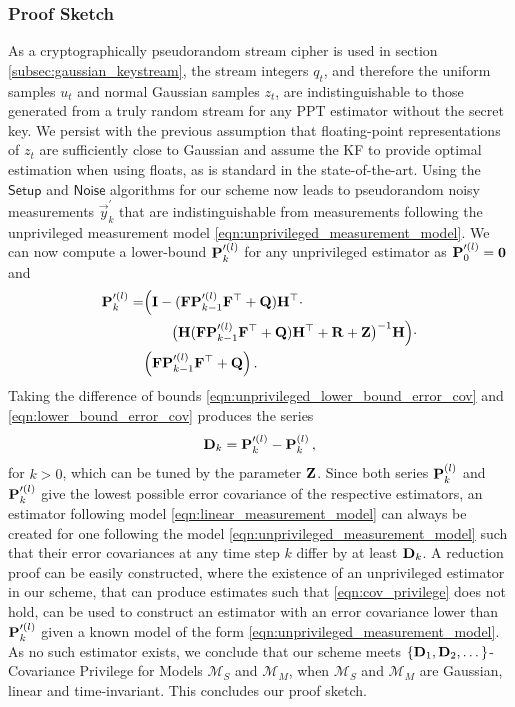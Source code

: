 \documentclass[letterpaper, 10 pt, conference]{ieeeconf}
\begin{document}
\subsubsection{Proof Sketch}
As a cryptographically pseudorandom stream cipher is used in section \ref{subsec:gaussian_keystream}, the stream integers $q_t$, and therefore the uniform samples $u_t$ and normal Gaussian samples $z_t$, are indistinguishable to those generated from a truly random stream for any PPT estimator without the secret key. We persist with the previous assumption that floating-point representations of $z_t$ are sufficiently close to Gaussian and assume the KF to provide optimal estimation when using floats, as is standard in the state-of-the-art. Using the $\mathsf{Setup}$ and $\mathsf{Noise}$ algorithms for our scheme now leads to pseudorandom noisy measurements $\vec{y}^\prime_k$ that are indistinguishable from measurements following the unprivileged measurement model \eqref{eqn:unprivileged_measurement_model}. We can now compute a lower-bound ${{\mathbf{P}}}_k^{\prime(l)}$ for any unprivileged estimator as ${{\mathbf{P}}}_0^{\prime(l)}={{\mathbf{0}}}$ and
\begin{equation}\label{eqn:unprivileged_lower_bound_error_cov}
   \begin{split}
      {\ensuremath{{\mathbf{P}}}}_k^{\prime(l)} =& \Bigl( {{\mathbf{I}}} - ({{\mathbf{F}}}{{\mathbf{P}}}_{k-1}^{\prime(l)}{{\mathbf{F}}}^\top + {{\mathbf{Q}}}){{\mathbf{H}}}^\top \cdot \\
      &\qquad\bigl({{\mathbf{H}}}({{\mathbf{F}}}{{\mathbf{P}}}_{k-1}^{\prime(l)}{{\mathbf{F}}}^\top + {{\mathbf{Q}}}){{\mathbf{H}}}^\top + {{\mathbf{R}}}+{{\mathbf{Z}}}\bigr)^{-1}{{\mathbf{H}}}\Bigr)\cdot\\
      &\Bigl({{\mathbf{F}}}{{\mathbf{P}}}_{k-1}^{\prime(l)}{{\mathbf{F}}}^\top + {{\mathbf{Q}}}\Bigr)\,.
   \end{split}
\end{equation}
Taking the difference of bounds \eqref{eqn:unprivileged_lower_bound_error_cov} and \eqref{eqn:lower_bound_error_cov} produces the series
\begin{equation}\label{eqn:covariance_difference_series}
   {\ensuremath{{\mathbf{D}}}}_k = {{\mathbf{P}}}_k^{\prime(l)} - {{\mathbf{P}}}_k^{(l)}\,,
\end{equation}
for $k>0$, which can be tuned by the parameter ${{\mathbf{Z}}}$. Since both series ${{\mathbf{P}}}_k^{(l)}$ and ${{\mathbf{P}}}_k^{\prime(l)}$ give the lowest possible error covariance of the respective estimators, an estimator following model \eqref{eqn:linear_measurement_model} can always be created for one following the model \eqref{eqn:unprivileged_measurement_model} such that their error covariances at any time step $k$ differ by at least ${{\mathbf{D}}}_k$. A reduction proof can be easily constructed, where the existence of an unprivileged estimator in our scheme, that can produce estimates such that \eqref{eqn:cov_privilege} does not hold, can be used to construct an estimator with an error covariance lower than ${{\mathbf{P}}}_k^{\prime(l)}$ given a known model of the form \eqref{eqn:unprivileged_measurement_model}. As no such estimator exists, we conclude that our scheme meets $\{{{\mathbf{D}}}_1,{{\mathbf{D}}}_2,\dots\}$-Covariance Privilege for Models $\mathcal{M}_S$ and $\mathcal{M}_M$, when $\mathcal{M}_S$ and $\mathcal{M}_M$ are Gaussian, linear and time-invariant. This concludes our proof sketch.
\end{document}
